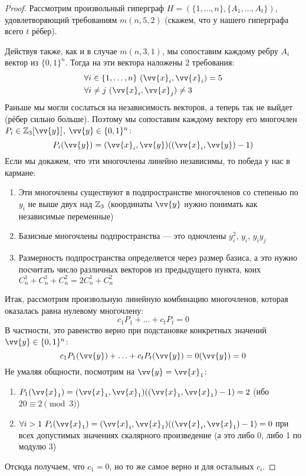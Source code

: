 \begin{proof}
	Рассмотрим произвольный гиперграф $H = (\{1, \ldots, n\}, \{A_1, \ldots, A_t\})$, удовлетворяющий требованиям $m(n, 5, 2)$ (скажем, что у нашего гиперграфа всего $t$ рёбер). 
	
	Действуя также, как и в случае $m(n, 3, 1)$, мы сопоставим каждому ребру $A_i$ вектор из $\{0, 1\}^n$. Тогда на эти вектора наложены 2 требования:
	\begin{align*}
		&{\forall i \in \range{n}\ (\vv{x}_i, \vv{x}_i) = 5}
		\\
		&{\forall i \neq j\ (\vv{x}_i, \vv{x}_j) \neq 3}
	\end{align*}
	Раньше мы могли сослаться на независимость векторов, а теперь так не выйдет (рёбер сильно больше). Поэтому мы сопоставим каждому вектору его многочлен $P_i \in \Z_3[\vv{y}]$, $\vv{y} \in \{0, 1\}^n$:
	\[
		P_i(\vv{y}) = (\vv{x}_i, \vv{y})((\vv{x}_i, \vv{y}) - 1)
	\]
	Если мы докажем, что эти многочлены линейно независимы, то победа у нас в кармане:
	\begin{enumerate}
		\item Эти многочлены существуют в подпространстве многочленов со степенью по $y_i$ не выше двух над $\mathbb{Z}_3$ (координаты $\vv{y}$ нужно понимать как независимые переменные)
		
		\item Базисные многочлены подпространства --- это одночлены $y_i^2$, $y_i$, $y_iy_j$
		
		\item Размерность подпространства определяется через размер базиса, а это нужно посчитать число различных векторов из предыдущего пункта, коих $C_n^1 + C_n^1 + C_n^2 = 2C_n^1 + C_n^2$
	\end{enumerate}
	Итак, рассмотрим произвольную линейную комбинацию многочленов, которая оказалась равна нулевому многочлену:
	\[
		c_1P_1 + \ldots + c_tP_t = 0
	\]
	В частности, это равенство верно при подстановке конкретных значений $\vv{y} \in \{0, 1\}^n$:
	\[
		c_1P_1(\vv{y}) + \ldots + c_tP_t(\vv{y}) = 0(\vv{y}) = 0
	\]
	Не умаляя общности, посмотрим на $\vv{y} = \vv{x}_1$:
	\begin{enumerate}
		\item $P_1(\vv{x}_1) = (\vv{x}_1, \vv{x}_1)((\vv{x}_1, \vv{x}_1) - 1) = 2$ (ибо $20 \equiv 2 \pmod 3$)
		
		\item $\forall i > 1\ P_i(\vv{x}_1) = (\vv{x}_i, \vv{x}_1)((\vv{x}_i, \vv{x}_1) - 1) = 0$ при всех допустимых значениях скалярного произведение (а это либо 0, либо 1 по модулю 3)
	\end{enumerate}
	Отсюда получаем, что $c_1 = 0$, но то же самое верно и для остальных $c_i$.
\end{proof}

